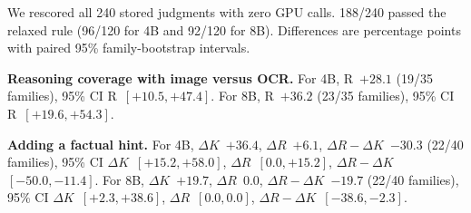 We rescored all 240 stored judgments with zero GPU calls. 188/240 passed the relaxed rule (96/120 for 4B and 92/120 for 8B). Differences are percentage points with paired 95\% family-bootstrap intervals.

\textbf{Reasoning coverage with image versus OCR.} For 4B, R~$+28.1$ (19/35 families), 95\% CI R~$[+10.5, +47.4]$. For 8B, R~$+36.2$ (23/35 families), 95\% CI R~$[+19.6, +54.3]$.

\textbf{Adding a factual hint.} For 4B, $\Delta K$~$+36.4$, $\Delta R$~$+6.1$, $\Delta R-\Delta K$~$-30.3$ (22/40 families), 95\% CI $\Delta K$~$[+15.2, +58.0]$, $\Delta R$~$[0.0, +15.2]$, $\Delta R-\Delta K$~$[-50.0, -11.4]$. For 8B, $\Delta K$~$+19.7$, $\Delta R$~$0.0$, $\Delta R-\Delta K$~$-19.7$ (22/40 families), 95\% CI $\Delta K$~$[+2.3, +38.6]$, $\Delta R$~$[0.0, 0.0]$, $\Delta R-\Delta K$~$[-38.6, -2.3]$.
